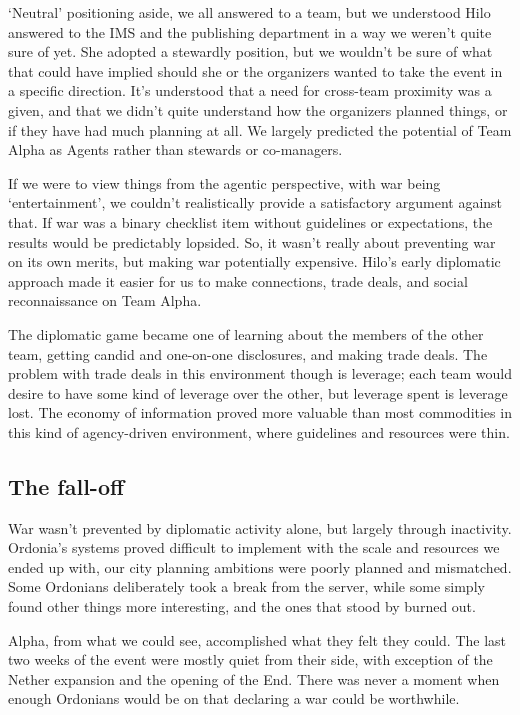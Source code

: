`Neutral' positioning aside, we all answered to a team, but we understood Hilo answered to the IMS and the publishing department in a way we weren't quite sure of yet. She adopted a stewardly position, but we wouldn't be sure of what that could have implied should she or the organizers wanted to take the event in a specific direction. It's understood that a need for cross-team proximity was a given, and that we didn't quite understand how the organizers planned things, or if they have had much planning at all. We largely predicted the potential of Team Alpha as Agents rather than stewards or co-managers.

If we were to view things from the agentic perspective, with war being `entertainment', we couldn't realistically provide a satisfactory argument against that. If war was a binary checklist item without guidelines or expectations, the results would be predictably lopsided. So, it wasn't really about preventing war on its own merits, but making war potentially expensive. Hilo's early diplomatic approach made it easier for us to make connections, trade deals, and social reconnaissance on Team Alpha.

The diplomatic game became one of learning about the members of the other team, getting candid and one-on-one disclosures, and making trade deals. The problem with trade deals in this environment though is leverage; each team would desire to have some kind of leverage over the other, but leverage spent is leverage lost. The economy of information proved more valuable than most commodities in this kind of agency-driven environment, where guidelines and resources were thin.

\subsection{The fall-off}
War wasn't prevented by diplomatic activity alone, but largely through inactivity. Ordonia's systems proved difficult to implement with the scale and resources we ended up with, our city planning ambitions were poorly planned and mismatched. Some Ordonians deliberately took a break from the server, while some simply found other things more interesting, and the ones that stood by burned out.

Alpha, from what we could see, accomplished what they felt they could. The last two weeks of the event were mostly quiet from their side, with exception of the Nether expansion and the opening of the End. There was never a moment when enough Ordonians would be on that declaring a war could be worthwhile.

